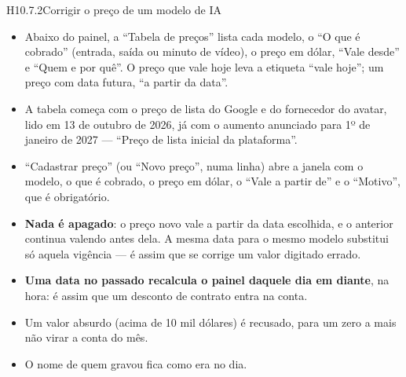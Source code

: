 \begin{historia}{H10.7.2}{Corrigir o preço de um modelo de IA}{\pronto}
\aceite
\begin{itemize}
  \item Abaixo do painel, a \enquote{Tabela de preços} lista cada modelo, o
    \enquote{O que é cobrado} (entrada, saída ou minuto de vídeo), o preço em
    dólar, \enquote{Vale desde} e \enquote{Quem e por quê}. O preço que vale
    hoje leva a etiqueta \enquote{vale hoje}; um preço com data futura,
    \enquote{a partir da data}.
  \item A tabela começa com o preço de lista do Google e do fornecedor do
    avatar, lido em 13 de outubro de 2026, já com o aumento anunciado para
    1º de janeiro de 2027 --- \enquote{Preço de lista inicial da plataforma}.
  \item \enquote{Cadastrar preço} (ou \enquote{Novo preço}, numa linha) abre a
    janela com o modelo, o que é cobrado, o preço em dólar, o
    \enquote{Vale a partir de} e o \enquote{Motivo}, que é obrigatório.
  \item \textbf{Nada é apagado}: o preço novo vale a partir da data escolhida,
    e o anterior continua valendo antes dela. A mesma data para o mesmo modelo
    substitui só aquela vigência --- é assim que se corrige um valor digitado
    errado.
  \item \textbf{Uma data no passado recalcula o painel daquele dia em diante},
    na hora: é assim que um desconto de contrato entra na conta.
  \item Um valor absurdo (acima de 10 mil dólares) é recusado, para um zero a
    mais não virar a conta do mês.
  \item O nome de quem gravou fica como era no dia.
\end{itemize}
\end{historia}
